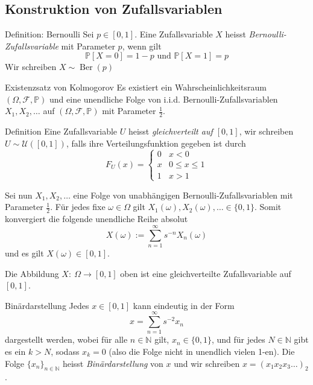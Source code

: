 \documentclass[a4paper,10pt]{article}
\def\N{\mathbb{N}}
\def\P{\mathbb{P}}
\DeclareMathOperator{\Bernoulli}{\mathrm{Ber}}
\begin{document}
\subsection{Konstruktion von Zufallsvariablen}

\begin{mainbox}{Definition: Bernoulli}
    Sei \( p \in [0, 1] \). Eine Zufallsvariable \( X \) heisst \emph{Bernoulli-Zufallsvariable} mit Parameter \( p \), wenn gilt
    \[ \P[X = 0] = 1 - p \text{ und } \P[X = 1] = p \]
    Wir schreiben \( X \sim \Bernoulli(p) \)
\end{mainbox}

\begin{subbox}{Existenzsatz von Kolmogorov}
    Es existiert ein Wahrscheinlichkeitsraum \( (\Omega, \mathcal{F}, \P) \) und eine unendliche Folge von i.i.d. Bernoulli-Zufallsvariablen \( X_1, X_2, \dots \) auf \( (\Omega, \mathcal{F}, \P) \) mit Parameter \( \frac{1}{2} \).
\end{subbox}

\begin{mainbox}{Definition}
    Eine Zufallsvariable \( U \) heisst \emph{gleichverteilt auf \( [0, 1] \)}, wir schreiben \( U \sim \mathcal{U}([0, 1]) \), falls ihre Verteilungsfunktion gegeben ist durch
    \[
        F_U(x) = \begin{cases}
            0 & x < 0 \\
            x & 0 \leq x \leq 1 \\
            1 & x > 1
        \end{cases}
    \]
\end{mainbox}

Sei nun \( X_1, X_2, \dots \) eine Folge von unabhängigen Bernoulli-Zufallsvariablen mit Parameter \( \frac{1}{2} \). Für jedes fixe \( \omega \in \Omega \) gilt \( X_1(\omega), X_2(\omega), \dots \in \{0, 1\} \). Somit konvergiert die folgende unendliche Reihe absolut
\[ X(\omega) := \sum_{n = 1}^\infty s^{-n} X_n(\omega) \]
und es gilt \( X(\omega) \in [0, 1] \).
\begin{subbox}{}
    Die Abbildung \(X: \: \Omega \to [0, 1] \) oben ist eine gleichverteilte Zufallsvariable auf \( [0, 1] \).
\end{subbox}

\begin{subbox}{Binärdarstellung}
    Jedes \( x \in [0, 1] \) kann eindeutig in der Form
    \[ x = \sum_{n = 1}^\infty s^{-2} x_n \]
    dargestellt werden, wobei für alle \( n \in \N \) gilt, \( x_n \in \{0, 1\} \), und für jedes \( N \in \N \) gibt es ein \( k > N \), sodass \( x_k = 0 \) (also die Folge  nicht in unendlich vielen 1-en). Die Folge \( \{x_n\}_{n \in \N} \) heisst \emph{Binärdarstellung} von \( x \) und wir schreiben \( x = (x_1 x_2 x_3 \dots)_2 \).
\end{subbox}
\end{document}
